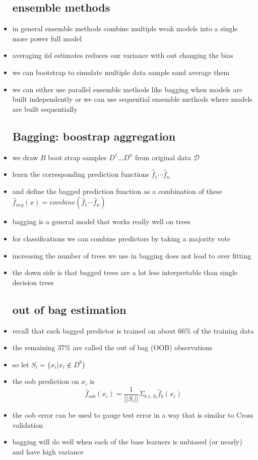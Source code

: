 \documentclass{article}
\begin{document}
\begin{itemize}
\subsection*{ensemble methods}
\item in general ensemble methods combine multiple weak models into a single more power full model
\item averaging iid estimates reduces our variance with out changing the bias 
\item we can bootstrap to simulate multiple data sample sand average them 
\item we can either use parallel ensemble methods like bagging when models are built independently
\itme or we can use sequential ensemble methods where models are built sequentially

\subsection*{Bagging: boostrap aggregation}
\item we draw $B$ boot strap samples $D^1...D^n$ from original data $\mathcal{D}$
\item learn the corresponding prediction functions  $\hat{f}_1\cdots \hat{f}_n$
\item and define the bagged prediction function as a combination of these $\hat{f}_{avg}(x)=combine(\hat{f}_1\cdots \hat{f}_n)$
\item bagging is a general model that works really well on trees
\item for classifications we can combine predictors by taking a majority vote
\item increasing the number of trees we use in bagging does not lead to over fitting 
\item the down side is that bagged trees are a lot less interpretable than single decision trees
\subsection*{out of bag estimation }
\item recall that each bagged predictor is trained on about 66\% of the training data 
\item the remaining 37\% are called the out of bag (OOB) observations 
\item so let $S_i=\{x_i|x_i\not \in D^{b}\}$
\item the oob prediction on $x_i$ is $$\hat{f}_{oob}(x_i)=\frac{1}{||S_i||}\Sigma_{b\in S_i}\hat{f}_{b}(x_i)$$
\item the oob error can be used to gauge test error in a way that is similar to Cross validation 
\item bagging will do well when each of the base learners is unbiased (or nearly) and have high variance

\end{itemize}
\end{document}
